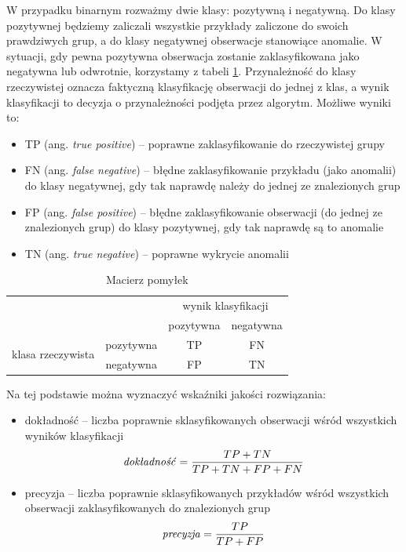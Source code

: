 \documentclass[11pt,a4paper,twoside]{article}
\begin{document}
W przypadku binarnym rozważmy dwie klasy: pozytywną i negatywną. Do klasy pozytywnej będziemy zaliczali wszystkie przykłady zaliczone do swoich prawdziwych grup, a do klasy negatywnej obserwacje stanowiące anomalie. W sytuacji, gdy pewna pozytywna obserwacja zostanie zaklasyfikowana jako negatywna lub odwrotnie, korzystamy z tabeli \ref{confusionMatrix}. Przynależność do klasy rzeczywistej oznacza faktyczną klasyfikację obserwacji do jednej z klas, a wynik klasyfikacji to decyzja o przynależności podjęta przez algorytm. Możliwe wyniki to:
\begin{itemize}[label={--}]
\item TP (ang. \emph{true positive}) -- poprawne zaklasyfikowanie do rzeczywistej grupy
\item FN (ang. \emph{false negative}) -- błędne zaklasyfikowanie przykładu (jako anomalii) do klasy negatywnej, gdy tak naprawdę należy do jednej ze znalezionych grup
\item FP (ang. \emph{false positive}) -- błędne zaklasyfikowanie obserwacji (do jednej ze znalezionych grup) do klasy pozytywnej, gdy tak naprawdę są to anomalie
\item TN (ang. \emph{true negative}) -- poprawne wykrycie anomalii
\end{itemize}

\begin{table}[ht]
\centering
\caption{Macierz pomyłek}
\label{confusionMatrix}
\begin{tabular}{|*{4}{c|}}
\cline{3-4}
  \multicolumn{2}{c}{} & \multicolumn{2}{|c|}{wynik klasyfikacji}\\\cline{3-4}
  \multicolumn{2}{c|}{} & pozytywna & negatywna\\\hline
  \multirow{2}{*}{klasa rzeczywista}& pozytywna & TP & FN\\\cline{2-4}
  & negatywna & FP & TN\\\hline
\end{tabular}
\end{table}

Na tej podstawie można wyznaczyć wskaźniki jakości rozwiązania:
\begin{itemize}[label={--}]
\item dokładność -- liczba poprawnie sklasyfikowanych obserwacji wśród wszystkich wyników klasyfikacji $$\text{\emph{dokładność}} = \frac{TP+TN}{TP+TN+FP+FN}$$
\item precyzja -- liczba poprawnie sklasyfikowanych przykładów wśród wszystkich obserwacji zaklasyfikowanych do znalezionych grup $$\text{\emph{precyzja}} = \frac{TP}{TP+FP}$$
\end{itemize}
\end{document}
